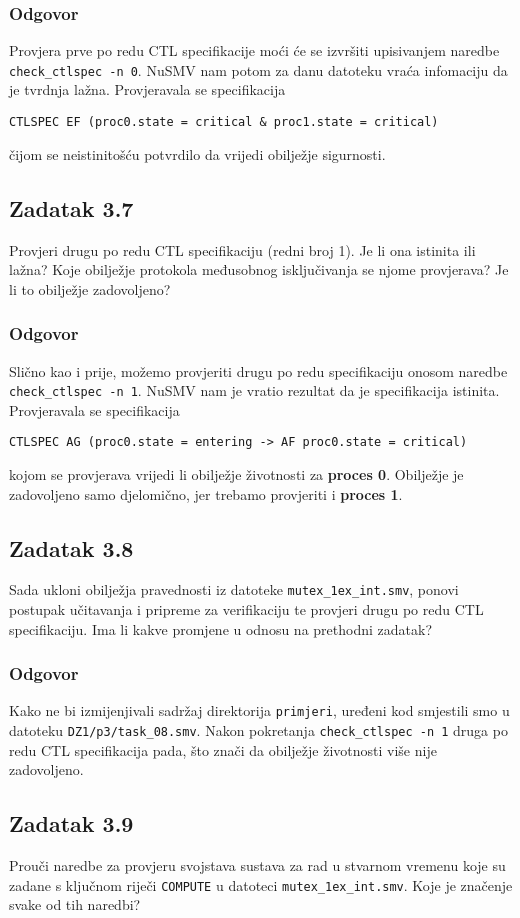 \documentclass{article}
\newcommand{\code}[1]{\colorbox{blue!15}{\texttt{#1}}}
\newcommand{\odgovor}{\subsubsection*{Odgovor}}
\newcommand{\zadatak}[1]{\subsection{Zadatak #1}}
\begin{document}
\odgovor

Provjera prve po redu CTL specifikacije moći će se izvršiti upisivanjem naredbe \code{check\_ctlspec -n 0}. NuSMV nam potom za danu datoteku vraća infomaciju da je tvrdnja lažna. Provjeravala se specifikacija

\begin{verbatim}
CTLSPEC EF (proc0.state = critical & proc1.state = critical)
\end{verbatim}

\noindent
čijom se neistinitošću potvrdilo da vrijedi obilježje sigurnosti.


\zadatak{3.7}

Provjeri drugu po redu CTL specifikaciju (redni broj 1). Je li ona istinita ili lažna? Koje obilježje protokola međusobnog isključivanja se njome provjerava? Je li to obilježje zadovoljeno? 

\odgovor

Slično kao i prije, možemo provjeriti drugu po redu specifikaciju onosom naredbe \code{check\_ctlspec -n 1}. NuSMV nam je vratio rezultat da je specifikacija istinita. Provjeravala se specifikacija

\begin{verbatim}
CTLSPEC AG (proc0.state = entering -> AF proc0.state = critical)
\end{verbatim}

\noindent
kojom se provjerava vrijedi li obilježje životnosti za \textbf{proces 0}. Obilježje je zadovoljeno samo djelomično, jer trebamo provjeriti i \textbf{proces 1}.


\zadatak{3.8}

Sada ukloni obilježja pravednosti iz datoteke \code{mutex\_1ex\_int.smv}, ponovi postupak učitavanja i pripreme za verifikaciju te provjeri drugu po redu CTL specifikaciju. Ima li kakve promjene u odnosu na prethodni zadatak?

\odgovor

Kako ne bi izmijenjivali sadržaj direktorija \code{primjeri}, uređeni kod smjestili smo u datoteku \code{DZ1/p3/task\_08.smv}. Nakon pokretanja \code{check\_ctlspec -n 1} druga po redu CTL specifikacija pada, što znači da obilježje životnosti više nije zadovoljeno.


\zadatak{3.9}

Prouči naredbe za provjeru svojstava sustava za rad u stvarnom vremenu koje su zadane s ključnom riječi \code{COMPUTE} u datoteci \code{mutex\_1ex\_int.smv}. Koje je značenje svake od tih naredbi?
\end{document}
